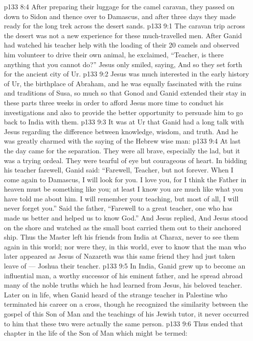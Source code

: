 \vs p133 8:4 After preparing their luggage for the camel caravan, they passed on down to Sidon and thence over to Damascus, and after three days they made ready for the long trek across the desert sands.
\vs p133 9:1 The caravan trip across the desert was not a new experience for these much\hyp{}travelled men. After Ganid had watched his teacher help with the loading of their 20 camels and observed him volunteer to drive their own animal, he exclaimed, “Teacher, is there anything that you cannot do?” Jesus only smiled, saying,  And so they set forth for the ancient city of Ur.
\vs p133 9:2 Jesus was much interested in the early history of Ur, the birthplace of Abraham, and he was equally fascinated with the ruins and traditions of Susa, so much so that Gonod and Ganid extended their stay in these parts three weeks in order to afford Jesus more time to conduct his investigations and also to provide the better opportunity to persuade him to go back to India with them.
\vs p133 9:3 It was at Ur that Ganid had a long talk with Jesus regarding the difference between knowledge, wisdom, and truth. And he was greatly charmed with the saying of the Hebrew wise man: 
\vs p133 9:4 \pc At last the day came for the separation. They were all brave, especially the lad, but it was a trying ordeal. They were tearful of eye but courageous of heart. In bidding his teacher farewell, Ganid said: “Farewell, Teacher, but not forever. When I come again to Damascus, I will look for you. I love you, for I think the Father in heaven must be something like you; at least I know you are much like what you have told me about him. I will remember your teaching, but most of all, I will never forget you.” Said the father, “Farewell to a great teacher, one who has made us better and helped us to know God.” And Jesus replied,  And Jesus stood on the shore and watched as the small boat carried them out to their anchored ship. Thus the Master left his friends from India at Charax, never to see them again in this world; nor were they, in this world, ever to know that the man who later appeared as Jesus of Nazareth was this same friend they had just taken leave of --- Joshua their teacher.
\vs p133 9:5 In India, Ganid grew up to become an influential man, a worthy successor of his eminent father, and he spread abroad many of the noble truths which he had learned from Jesus, his beloved teacher. Later on in life, when Ganid heard of the strange teacher in Palestine who terminated his career on a cross, though he recognized the similarity between the gospel of this Son of Man and the teachings of his Jewish tutor, it never occurred to him that these two were actually the same person.
\vs p133 9:6 \pc Thus ended that chapter in the life of the Son of Man which might be termed: 
